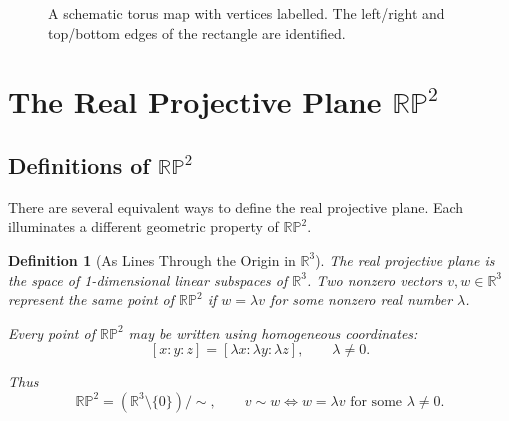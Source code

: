 \documentclass[12pt,a4paper]{article}
\theoremstyle{plain}
\newtheorem{definition}{Definition}
\theoremstyle{definition}      %
\begin{document}
\begin{figure}[h]
		\caption{A schematic torus map with vertices labelled.
			The left/right and top/bottom edges of the rectangle are identified.}
		\label{fig:torus-map-labelled}
	\end{figure}
	
	\clearpage
	
\section{The Real Projective Plane \texorpdfstring{$\mathbb{RP}^2$}{RP2}}

\subsection{Definitions of $\mathbb{RP}^2$}

There are several equivalent ways to define the real projective plane.  
Each illuminates a different geometric property of $\mathbb{RP}^2$.

\begin{definition}[As Lines Through the Origin in $\mathbb{R}^3$]
	The real projective plane is the space of 1-dimensional linear subspaces of
	$\mathbb{R}^3$.  Two nonzero vectors $v,w \in \mathbb{R}^3$ represent the same
	point of $\mathbb{RP}^2$ if $w = \lambda v$ for some nonzero real number
	$\lambda$.  
	
	Every point of $\mathbb{RP}^2$ may be written using homogeneous coordinates:
	\[
	[x:y:z] = [\lambda x : \lambda y : \lambda z], \qquad \lambda \neq 0.
	\]
	
	Thus
	\[
	\mathbb{RP}^2 = (\mathbb{R}^3 \setminus \{0\}) / \!\sim ,
	\qquad v \sim w \Longleftrightarrow w = \lambda v \text{ for some } \lambda \ne 0.
	\]
\end{definition}
\end{document}
